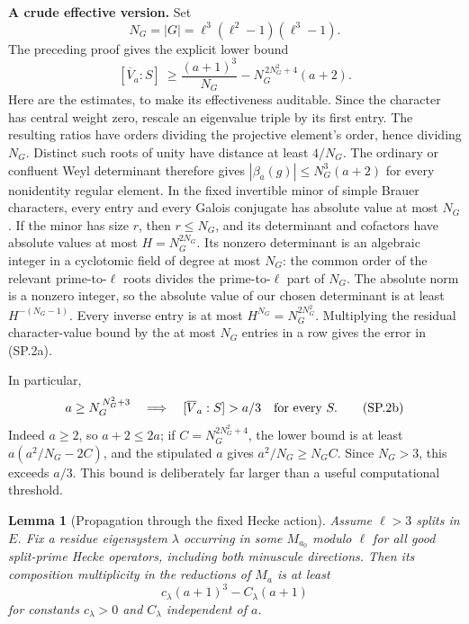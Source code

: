\documentclass[11pt,a4paper]{article}
\newtheorem{lemma}[theorem]{Lemma}
\theoremstyle{definition}
\renewcommand{\paragraph}[1]{\par\smallskip\noindent\textbf{#1}\quad\ignorespaces}
\begin{document}
\paragraph{A crude effective version.}
Set
\[
                  N_G=|G|=\ell^3(\ell^2-1)(\ell^3-1).
\]
The preceding proof gives the explicit lower bound
\[
 [\overline V_a:S]\ \geq
 \frac{(a+1)^3}{N_G}
       -N_G^{\,2N_G^2+4}(a+2).
                                                               \tag{SP.2a}
\]
Here are the estimates, to make its effectiveness auditable.
Since the character has central weight zero, rescale an
eigenvalue triple by its first entry. The resulting ratios
have orders dividing the projective element's order, hence
dividing $N_G$. Distinct such roots of unity have distance
at least $4/N_G$. The ordinary or confluent Weyl determinant
therefore gives
$|\beta_a(g)|\leq N_G^3(a+2)$ for every nonidentity regular
element. In the fixed invertible minor of simple Brauer
characters, every entry and every Galois conjugate has
absolute value at most $N_G$. If the minor has size $r$,
then $r\leq N_G$, and its determinant and cofactors have
absolute values at most
$H=N_G^{2N_G}$. Its nonzero determinant is an algebraic
integer in a cyclotomic field of degree at most $N_G$:
the common order of the relevant prime-to-$\ell$ roots
divides the prime-to-$\ell$ part of $N_G$.
The absolute norm is a nonzero integer, so the absolute
value of our chosen determinant is at least
$H^{-(N_G-1)}$. Every inverse entry is at most
$H^{N_G}=N_G^{2N_G^2}$.
Multiplying the residual character-value bound by the at
most $N_G$ entries in a row gives the error in (SP.2a).

In particular,
\[
                  a\geq N_G^{\,N_G^2+3}
        \quad\Longrightarrow\quad
                       [\overline V_a:S]>a/3
                           \quad\hbox{for every }S.
                                                               \tag{SP.2b}
\]
Indeed $a\geq2$, so $a+2\leq2a$; if
$C=N_G^{2N_G^2+4}$, the lower bound is at least
$a(a^2/N_G-2C)$, and the stipulated $a$ gives
$a^2/N_G\geq N_G C$. Since $N_G>3$, this exceeds $a/3$.
This bound is deliberately far larger than a useful
computational threshold.

\begin{lemma}[Propagation through the fixed Hecke action]
Assume $\ell>3$ splits in $E$. Fix a residue eigensystem
$\lambda$ occurring in some $M_{a_0}$ modulo $\ell$ for
all good split-prime Hecke operators, including both
minuscule directions. Then its composition multiplicity
in the reductions of $M_a$ is at least
\[
                            c_\lambda(a+1)^3-C_\lambda(a+1)
                                                               \tag{SP.5}
\]
for constants $c_\lambda>0$ and $C_\lambda$ independent
of $a$.
\end{lemma}
\end{document}
